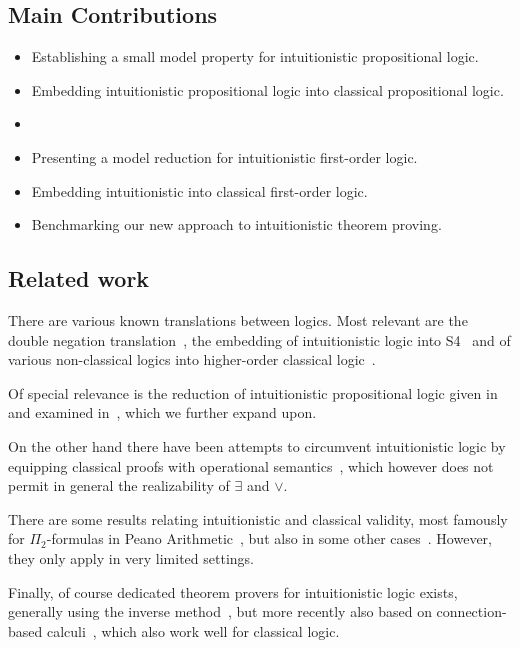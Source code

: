 \documentclass[runningheads]{llncs}
\begin{document}
\subsection*{Main Contributions}
\begin{itemize}
	\item Establishing a small model property for intuitionistic propositional logic.
	\item Embedding intuitionistic propositional logic into classical propositional logic.
	\item {}
	\item Presenting a model reduction for intuitionistic first-order logic.
	\item Embedding intuitionistic into classical first-order logic.
	\item Benchmarking our new approach to intuitionistic theorem proving.
\end{itemize}

\subsection*{Related work}

There are various known translations between logics. Most relevant are the double negation translation~\cite{glivenko1929quelques,gentzen1936widerspruchsfreiheit}, the embedding of intuitionistic logic into S4~\cite{basicprooftheory} and of various non-classical logics into higher-order classical logic~\cite{LEO,wisniewski2016tptp}.

Of special relevance is the reduction of intuitionistic propositional logic given in~\cite{claessen2015sat} and examined in~\cite{fiorentini2019proof}, which we further expand upon.

On the other hand there have been attempts to circumvent intuitionistic logic by equipping classical proofs with operational semantics~\cite{Control1,Parigot1}, which however does not permit in general the realizability of $\exists$ and $\vee$.

There are some results relating intuitionistic and classical validity, most famously for $\Pi_2$-formulas in Peano Arithmetic~\cite{friedman1978classically}, but also in some other cases~\cite{schwichtenberg}. However, they only apply in very limited settings.

Finally, of course dedicated theorem provers for intuitionistic logic exists, generally using the inverse method~\cite{mclaughlin2008imogen,pavlov2017whaleprover}, but more recently also based on connection-based calculi~\cite{otten2008leancop,otten2021nanocop}, which also work well for classical logic.
\end{document}
